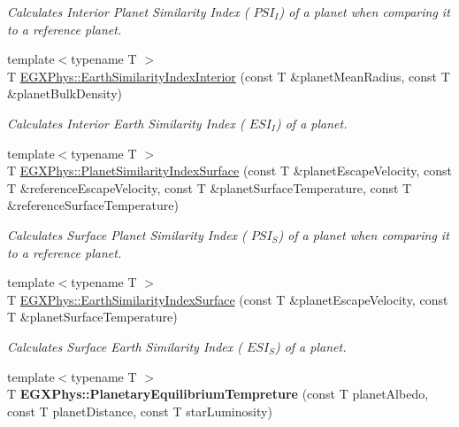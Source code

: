 \begin{DoxyCompactItemize}
\begin{DoxyCompactList}\small\item\em Calculates Interior Planet Similarity Index ( $PSI_I$) of a planet when comparing it to a reference planet. \end{DoxyCompactList}\item 
{\footnotesize template$<$typename T $>$ }\\T \hyperlink{group___astrophysics_ga699bcc2f17b8855eaa856595d8032f61}{E\+G\+X\+Phys\+::\+Earth\+Similarity\+Index\+Interior} (const T \&planet\+Mean\+Radius, const T \&planet\+Bulk\+Density)
\begin{DoxyCompactList}\small\item\em Calculates Interior Earth Similarity Index ( $ESI_I$) of a planet. \end{DoxyCompactList}\item 
{\footnotesize template$<$typename T $>$ }\\T \hyperlink{group___astrophysics_gae0c7dce2779d66b0560ca388a34ddc39}{E\+G\+X\+Phys\+::\+Planet\+Similarity\+Index\+Surface} (const T \&planet\+Escape\+Velocity, const T \&reference\+Escape\+Velocity, const T \&planet\+Surface\+Temperature, const T \&reference\+Surface\+Temperature)
\begin{DoxyCompactList}\small\item\em Calculates Surface Planet Similarity Index ( $PSI_S$) of a planet when comparing it to a reference planet. \end{DoxyCompactList}\item 
{\footnotesize template$<$typename T $>$ }\\T \hyperlink{group___astrophysics_ga1df772b0ed354ca7f7e4a7a4af072325}{E\+G\+X\+Phys\+::\+Earth\+Similarity\+Index\+Surface} (const T \&planet\+Escape\+Velocity, const T \&planet\+Surface\+Temperature)
\begin{DoxyCompactList}\small\item\em Calculates Surface Earth Similarity Index ( $ESI_S$) of a planet. \end{DoxyCompactList}\item 
\mbox{\label{group___astrophysics_gaeac3ced5104701ee02fc100f7cf4c189}} 
{\footnotesize template$<$typename T $>$ }\\T {\bfseries E\+G\+X\+Phys\+::\+Planetary\+Equilibrium\+Tempreture} (const T planet\+Albedo, const T planet\+Distance, const T star\+Luminosity)
\item 
\mbox{\label{group___astrophysics_ga099c12876fba6deb13ae2cf0e92644fe}} 

\end{DoxyCompactItemize}
